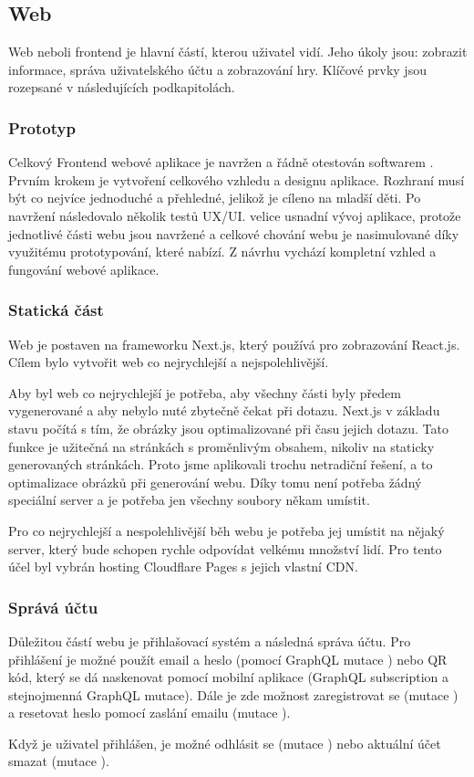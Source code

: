 \subsection{Web}
Web neboli frontend je hlavní částí, kterou uživatel vidí. Jeho úkoly jsou: zobrazit informace, správa uživatelského účtu a zobrazování hry. Klíčové prvky jsou rozepsané v následujících podkapitolách.

\subsubsection{Prototyp}
Celkový Frontend webové aplikace je navržen a řádně otestován softwarem . Prvním krokem je vytvoření celkového vzhledu a designu aplikace. Rozhraní musí být co nejvíce jednoduché a přehledné, jelikož je cíleno na mladší děti. Po navržení následovalo několik testů UX/UI.  velice usnadní vývoj aplikace, protože jednotlivé části webu jsou navržené a celkové chování webu je nasimulované díky využitému prototypování, které  nabízí. Z návrhu vychází kompletní vzhled a fungování webové aplikace.

\subsubsection{Statická část}
Web je postaven na frameworku Next.js, který používá pro zobrazování React.js. Cílem bylo vytvořit web co nejrychlejší a nejspolehlivější.\par
Aby byl web co nejrychlejší je potřeba, aby všechny části byly předem vygenerované a aby nebylo nuté zbytečně čekat při dotazu. Next.js v základu stavu počítá s tím, že obrázky jsou optimalizované při času jejich dotazu. Tato funkce je užitečná na stránkách s proměnlivým obsahem, nikoliv na staticky generovaných stránkách. Proto jsme aplikovali trochu netradiční řešení, a to optimalizace obrázků při generování webu. Díky tomu není potřeba žádný speciální server a je potřeba jen všechny soubory někam umístit.\par
Pro co nejrychlejší a nespolehlivější běh webu je potřeba jej umístit na nějaký server, který bude schopen rychle odpovídat velkému množství lidí. Pro tento účel byl vybrán hosting Cloudflare Pages\cite{Cloudflare-pages} s jejich vlastní CDN\cite{Cloudflare-cdn}. 

\subsubsection{Správá účtu}
Důležitou částí webu je přihlašovací systém a následná správa účtu. Pro přihlášení je možné použít email a heslo (pomocí GraphQL mutace ) nebo QR kód, který se dá naskenovat pomocí mobilní aplikace (GraphQL subscription  a stejnojmenná GraphQL mutace). Dále je zde možnost zaregistrovat se (mutace ) a resetovat heslo pomocí zaslání emailu (mutace ).\par
Když je uživatel přihlášen, je možné odhlásit se (mutace ) nebo aktuální účet smazat (mutace ).


